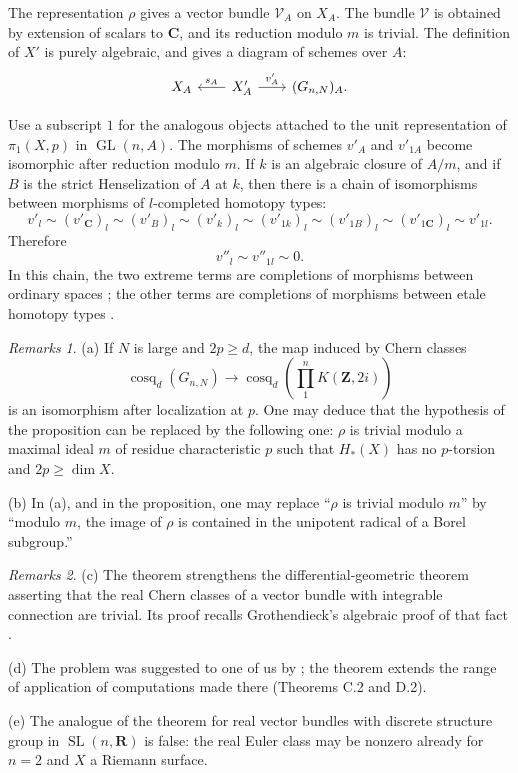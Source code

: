 \documentclass[11pt]{amsart}
\theoremstyle{plain}
\theoremstyle{definition}
\theoremstyle{remark}
\newtheorem*{remarks*}{Remarks}
\DeclareMathOperator{\GL}{GL}
\DeclareMathOperator{\cosq}{cosq}
\providecommand{\Z}{\mathbf Z}
\providecommand{\C}{\mathbf C}
\providecommand{\R}{\mathbf R}
\begin{document}
The representation $\rho$ gives a vector bundle $\mathscr V_A$ on $X_A$. The bundle $\mathscr V$ is obtained by extension of scalars to $\C$, and its reduction modulo $m$ is trivial. The definition of $X'$ is purely algebraic, and gives a diagram of schemes over $A$:
\[
\begin{tikzcd}[column sep=2em]
X_A & X'_A \arrow[l,"s_A"'] \arrow[r,"v'_A"] & (G_{n,N})_A .
\end{tikzcd}
\]

Use a subscript $1$ for the analogous objects attached to the unit representation of $\pi_1(X,p)$ in $\GL(n,A)$. The morphisms of schemes $v'_A$ and $v'_{1A}$ become isomorphic after reduction modulo $m$. If $k$ is an algebraic closure of $A/m$, and if $B$ is the strict Henselization of $A$ at $k$, then there is a chain of isomorphisms between morphisms of $l$-completed homotopy types:
\[
v'_l\sim (v'_\C)_l\sim (v'_B)_l\sim (v'_k)_l\sim (v'_{1k})_l\sim (v'_{1B})_l\sim (v'_{1\C})_l\sim v'_{1l}.
\]
Therefore
\[
v''_l\sim v''_{1l}\sim0.
\]
In this chain, the two extreme terms are completions of morphisms between ordinary spaces \cite[Section 3]{SullivanMaps}; the other terms are completions of morphisms between etale homotopy types \cite{ArtinMazur}.

\begin{remarks*}
(a) If $N$ is large and $2p\ge d$, the map induced by Chern classes
\[
\cosq_d(G_{n,N})\to \cosq_d\!\left(\prod_1^nK(\Z,2i)\right)
\]
is an isomorphism after localization at $p$. One may deduce that the hypothesis of the proposition can be replaced by the following one: $\rho$ is trivial modulo a maximal ideal $m$ of residue characteristic $p$ such that $H_*(X)$ has no $p$-torsion and $2p\ge\dim X$.

(b) In (a), and in the proposition, one may replace ``$\rho$ is trivial modulo $m$'' by ``modulo $m$, the image of $\rho$ is contained in the unipotent radical of a Borel subgroup.''
\end{remarks*}

\begin{remarks*}
(c) The theorem strengthens the differential-geometric theorem \cite{Milnor} asserting that the real Chern classes of a vector bundle with integrable connection are trivial. Its proof recalls Grothendieck's algebraic proof of that fact \cite{GrothendieckChern}.

(d) The problem was suggested to one of us by \cite{SullivanInf}; the theorem extends the range of application of computations made there (Theorems C.2 and D.2).

(e) The analogue of the theorem for real vector bundles with discrete structure group in $\operatorname{SL}(n,\R)$ is false: the real Euler class may be nonzero already for $n=2$ and $X$ a Riemann surface.
\end{remarks*}
\end{document}
